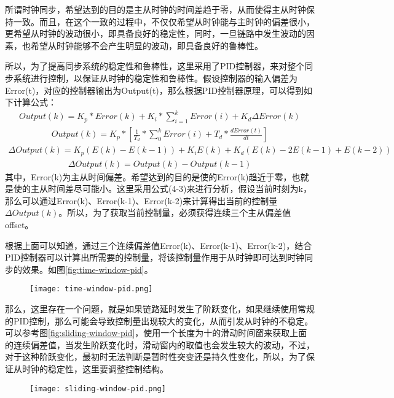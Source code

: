 所谓时钟同步，希望达到的目的是主从时钟的时间差趋于零，从而使得主从时钟保持一致。而且，在这个一致的过程中，不仅仅希望从时钟能与主时钟的偏差很小，更希望从时钟的波动很小，即具备良好的稳定性，同时，一旦链路中发生波动的因素，也希望从时钟能够不会产生明显的波动，即具备良好的鲁棒性。

所以，为了提高同步系统的稳定性和鲁棒性，这里采用了PID控制器，来对整个同步系统进行控制，以保证从时钟的稳定性和鲁棒性。假设控制器的输入偏差为Error(t)，对应的控制器输出为Output(t)，那么根据PID控制器原理，可以得到如下计算公式：
\begin {align}
Output(k) = K_{p} * Error(k) + K_{i} * \sum_{i=1}^{k}Error(i) + K_{d}\Delta Error(k)
\end{align}
\begin {align}
Output(k) = K_{p} * [\frac{1}{T_{d}} * \sum_{0}^{k}Error(i) + T_{d} * \frac{dError(t)}{dt}]
\end{align}
\begin {align}
\Delta Output(k) = K_{p}(E(k) - E(k-1)) + K_{i}E(k) + K_{d}(E(k) - 2E(k-1) + E(k-2))
\end{align}
\begin {align}
\Delta Output(k) = Output(k) - Output(k-1)
\end{align}
其中，Error(k)为主从时间偏差。希望达到的目的是使的Error(k)趋近于零，也就是使的主从时间差尽可能小。这里采用公式(4-3)来进行分析，假设当前时刻为k，那么可以通过Error(k)、Error(k-1)、Error(k-2)来计算得出当前的控制量$\Delta Output(k)$。所以，为了获取当前控制量，必须获得连续三个主从偏差值offset。

根据上面可以知道，通过三个连续偏差值Error(k)、Error(k-1)、Error(k-2)，结合PID控制器可以计算出所需要的控制量，将该控制量作用于从时钟即可达到时钟同步的效果。如图\ref{fig:time-window-pid}。
\begin{figure}[htbp]
  \centering
  \begin{minipage}[b]{0.7\textwidth}
   \captionstyle{\centering}
   \centering
   \texttt{[image: time-window-pid.png]}
  \end{minipage}     
\end{figure}


那么，这里存在一个问题，就是如果链路延时发生了阶跃变化，如果继续使用常规的PID控制，那么可能会导致控制量出现较大的变化，从而引发从时钟的不稳定。可以参考图\ref{fig:sliding-window-pid}，使用一个长度为十的滑动时间窗来获取上面的连续偏差值，当发生阶跃变化时，滑动窗内的取值也会发生较大的波动，不过，对于这种阶跃变化，最初时无法判断是暂时性突变还是持久性变化，所以，为了保证从时钟的稳定性，这里要调整控制结构。
\begin{figure}[htbp]
  \centering
  \begin{minipage}[b]{0.7\textwidth}
   \captionstyle{\centering}
   \centering
   \texttt{[image: sliding-window-pid.png]}
  \end{minipage}     
\end{figure}

